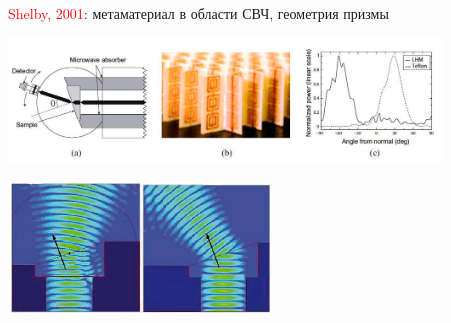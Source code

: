 \documentclass[9pt, compress, xcolor=table]{beamer}
\begin{document}
\begin{frame}{}

 \textcolor{red}{Shelby, 2001}: метаматериал в области СВЧ, геометрия призмы
\begin{center}
\includegraphics[width=11.5cm]{neg_ref_9}
\end{center}

\begin{center}
\includegraphics[width=7cm]{neg_ref_10}
\end{center}
\end{frame}
\end{document}
